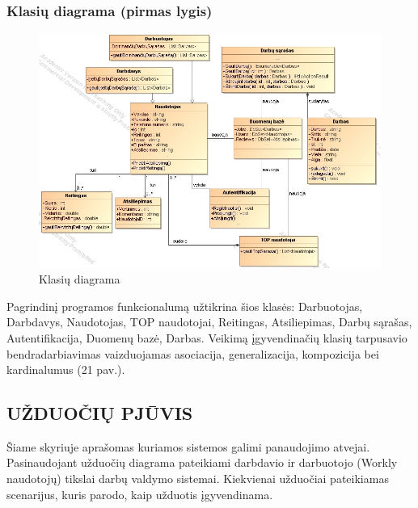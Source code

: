 \documentclass{VUMIFPSkursinis}
\begin{document}
\subsubsection{Klasių diagrama (pirmas lygis)}
\begin{figure}[H]
\centering
\includegraphics[width=\linewidth, frame]{img/klasiu.png}
\caption{Klasių diagrama}
\end{figure}
Pagrindinį programos funkcionalumą užtikrina šios klasės: Darbuotojas, Darbdavys, Naudotojas, TOP naudotojai, Reitingas, Atsiliepimas, Darbų sąrašas, Autentifikacija, Duomenų bazė, Darbas. Veikimą įgyvendinačių klasių tarpusavio bendradarbiavimas vaizduojamas asociacija, generalizacija, kompozicija bei  kardinalumus (21 pav.).
\newpage

\subsection{UŽDUOČIŲ PJŪVIS}
Šiame skyriuje aprašomas kuriamos sistemos galimi panaudojimo atvejai. Pasinaudojant užduočių diagrama  pateikiami darbdavio ir darbuotojo (Workly naudotojų) tikslai darbų valdymo sistemai.  Kiekvienai užduočiai pateikiamas scenarijus, kuris parodo, kaip užduotis įgyvendinama.
\end{document}
